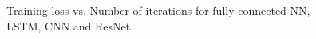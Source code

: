 \documentclass[11pt]{article}
\theoremstyle{k}
\begin{document}
\begin{figure}[H]
{{}
}
\caption{Training loss vs. Number of iterations for fully connected NN, LSTM, CNN and ResNet.}
\label{fig:train_loss_app}
\end{figure}




\end{document}
